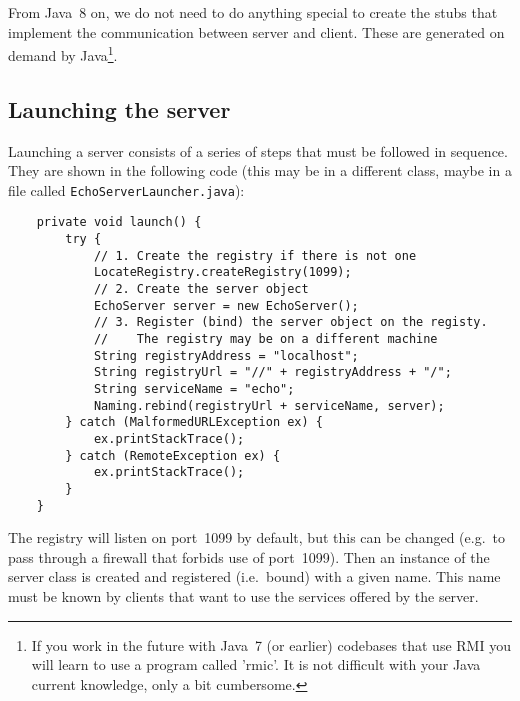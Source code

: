 From Java~8 on, we do not need to do anything special to create the
stubs that implement the communication between server and
client. These are generated on demand by Java\footnote{If you work in
  the future with Java~7 (or earlier) codebases that use RMI you will
  learn to use a program called 'rmic'. It is not difficult
  with your Java current knowledge, only a bit cumbersome.}.




\subsection{Launching the server}
\label{sec:launching-server}

Launching a server consists of a series of steps that must be followed
in sequence. They are shown in the following code (this may be in a
different class, maybe in a file called \verb+EchoServerLauncher.java+): 

\begin{verbatim}
    private void launch() {
        try {
            // 1. Create the registry if there is not one
            LocateRegistry.createRegistry(1099);
            // 2. Create the server object
            EchoServer server = new EchoServer();
            // 3. Register (bind) the server object on the registy. 
            //    The registry may be on a different machine
            String registryAddress = "localhost";
            String registryUrl = "//" + registryAddress + "/";
            String serviceName = "echo";
            Naming.rebind(registryUrl + serviceName, server);
        } catch (MalformedURLException ex) {
            ex.printStackTrace();
        } catch (RemoteException ex) {
            ex.printStackTrace();
        }
    }
\end{verbatim}

The registry will listen on port~1099 by default, but this
can be changed (e.g.~to pass through a firewall that forbids use of
port~1099). Then an instance of the server class is created and
registered (i.e.~bound) with a given name. This name must be known by
clients that want to use the services offered by the server.

